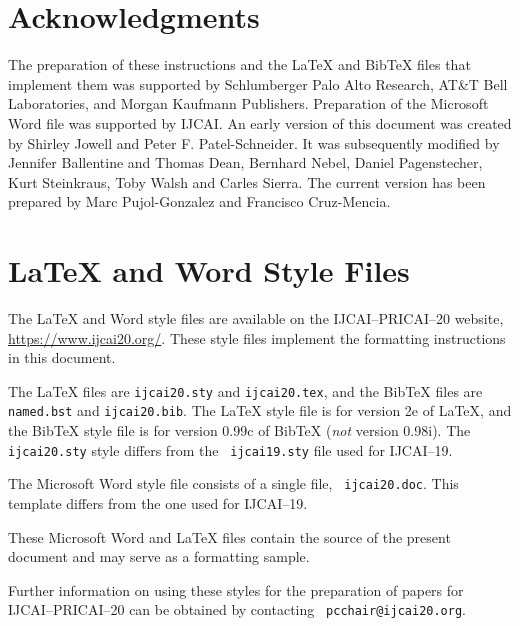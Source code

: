 \documentclass{article}
\begin{document}
\section*{Acknowledgments}

The preparation of these instructions and the \LaTeX{} and Bib\TeX{}
files that implement them was supported by Schlumberger Palo Alto
Research, AT\&T Bell Laboratories, and Morgan Kaufmann Publishers.
Preparation of the Microsoft Word file was supported by IJCAI.  An
early version of this document was created by Shirley Jowell and Peter
F. Patel-Schneider.  It was subsequently modified by Jennifer
Ballentine and Thomas Dean, Bernhard Nebel, Daniel Pagenstecher,
Kurt Steinkraus, Toby Walsh and Carles Sierra. The current version 
has been prepared by Marc Pujol-Gonzalez and Francisco Cruz-Mencia.

\appendix

\section{\LaTeX{} and Word Style Files}\label{stylefiles}

The \LaTeX{} and Word style files are available on the IJCAI--PRICAI--20
website, \url{https://www.ijcai20.org/}.
These style files implement the formatting instructions in this
document.

The \LaTeX{} files are {\tt ijcai20.sty} and {\tt ijcai20.tex}, and
the Bib\TeX{} files are {\tt named.bst} and {\tt ijcai20.bib}. The
\LaTeX{} style file is for version 2e of \LaTeX{}, and the Bib\TeX{}
style file is for version 0.99c of Bib\TeX{} ({\em not} version
0.98i). The {\tt ijcai20.sty} style differs from the {\tt
ijcai19.sty} file used for IJCAI--19.

The Microsoft Word style file consists of a single file, {\tt
ijcai20.doc}. This template differs from the one used for
IJCAI--19.

These Microsoft Word and \LaTeX{} files contain the source of the
present document and may serve as a formatting sample.  

Further information on using these styles for the preparation of
papers for IJCAI--PRICAI--20 can be obtained by contacting {\tt
pcchair@ijcai20.org}.



\end{document}
